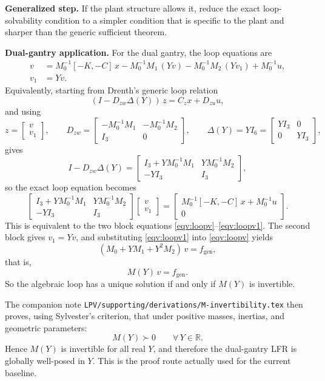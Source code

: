 ﻿\documentclass[11pt]{article}
\newcommand{\R}{\mathbb{R}}
\newcommand{\audititem}[2]{\par\smallskip\noindent\textbf{#1.} #2\par}
\begin{document}
\audititem{Generalized step}{If the plant structure allows it, reduce the exact
loop-solvability condition to a simpler condition that is specific to the plant
and sharper than the generic sufficient theorem.}

\audititem{Dual-gantry application}{For the dual gantry, the loop equations are
\begin{align}
    v   &= M_0^{-1}[-K,-C]\,x - M_0^{-1}M_1\,(Yv)
           - M_0^{-1}M_2\,(Yv_1) + M_0^{-1}u,
           \label{eqv:loopv} \\
    v_1 &= Yv. \label{eqv:loopv1}
\end{align}
Equivalently, starting from Drenth's generic loop relation
\[
    (I-D_{zw}\Delta(Y))\,z = C_z x + D_{zu}u,
\]
and using
\[
    z=\begin{bmatrix}v\\v_1\end{bmatrix},\qquad
    D_{zw}=
    \begin{bmatrix}
        -M_0^{-1}M_1 & -M_0^{-1}M_2 \\
        I_3 & 0
    \end{bmatrix},
    \qquad
    \Delta(Y)=YI_6=
    \begin{bmatrix}
        YI_3 & 0 \\
        0 & YI_3
    \end{bmatrix},
\]
gives
\[
    I-D_{zw}\Delta(Y)=
    \begin{bmatrix}
        I_3 + YM_0^{-1}M_1 & YM_0^{-1}M_2 \\
        -YI_3 & I_3
    \end{bmatrix},
\]
so the exact loop equation becomes
\[
    \begin{bmatrix}
        I_3 + YM_0^{-1}M_1 & YM_0^{-1}M_2 \\
        -YI_3 & I_3
    \end{bmatrix}
    \begin{bmatrix}
        v \\
        v_1
    \end{bmatrix}
    =
    \begin{bmatrix}
        M_0^{-1}[-K,-C]\,x + M_0^{-1}u \\
        0
    \end{bmatrix}.
\]
This is equivalent to the two block equations \eqref{eqv:loopv}--\eqref{eqv:loopv1}. The
second block gives \(v_1=Yv\), and substituting \eqref{eqv:loopv1} into
\eqref{eqv:loopv} yields
\[
(M_0 + YM_1 + Y^2 M_2)\,v = f_{\mathrm{gen}},
\]
that is,
\begin{equation}
    M(Y)\,v = f_{\mathrm{gen}}.
    \label{eqv:loopreduced}
\end{equation}
So the algebraic loop has a unique solution if and only if $M(Y)$ is
invertible.

The companion note \texttt{LPV/supporting/derivations/M-invertibility.tex} then proves, using
Sylvester's criterion, that under positive masses, inertias, and geometric
parameters:
\[
M(Y) \succ 0 \qquad \forall\, Y \in \R.
\]
Hence $M(Y)$ is invertible for all real $Y$, and therefore the dual-gantry LFR
is globally well-posed in $Y$. This is the proof route actually used for the
current baseline.}
\end{document}
